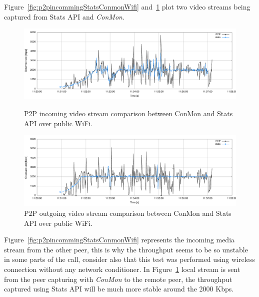 Figure~\ref{fig:p2pincommingStatsConmonWifi} and~\ref{fig:p2poutgoingStatsConmonWifi} plot two video streams being captured from Stats API and {\it ConMon}.

\begin{figure}[h]
	\begin{minipage}{.5\textwidth}
		\includegraphics[width=1\textwidth]{./figures/p2pincommingStatsConmonWifi.pdf}
			\caption[P2P incoming video stream comparison between ConMon and Stats API over public WiFi]{P2P incoming video stream comparison between ConMon and Stats API over public WiFi.}
			\label{fig:p2pincommingStatsConmonWifi}
	 \end{minipage}
	 \begin{minipage}{.5\textwidth}
		\includegraphics[width=1\textwidth]{./figures/p2poutgoingStatsConmonWifi.pdf}
			\caption[P2P outgoing video stream comparison between ConMon and Stats API over public WiFi]{P2P outgoing video stream comparison between ConMon and Stats API over public WiFi.}
			\label{fig:p2poutgoingStatsConmonWifi}
	 \end{minipage}
\end{figure}

Figure~\ref{fig:p2pincommingStatsConmonWifi} represents the incoming media stream from the other peer, this is why the throughput seems to be so unstable in some parts of the call, consider also that this test was performed using wireless connection without any network conditioner. In Figure~\ref{fig:p2poutgoingStatsConmonWifi} local stream is sent from the peer capturing with {\it ConMon} to the remote peer, the throughput captured using Stats API will be much more stable around the 2000 Kbps.

